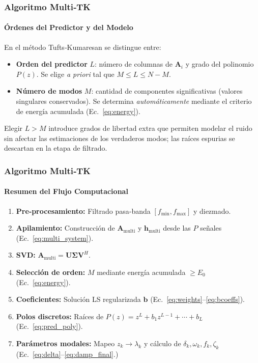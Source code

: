 \documentclass{beamer}
\begin{document}
\begin{frame}
\frametitle{Algoritmo Multi‑TK}
\framesubtitle{Órdenes del Predictor y del Modelo}

En el método Tufts‑Kumaresan se distingue entre:
\begin{itemize}
    \item \textbf{Orden del predictor} $L$: número de columnas de $\mathbf{A}_i$ y
          grado del polinomio $P(z)$. Se elige \emph{a priori} tal que
          $M \le L \le N-M$.
    \item \textbf{Número de modos} $M$: cantidad de componentes significativas
          (valores singulares conservados). Se determina \emph{automáticamente}
          mediante el criterio de energía acumulada (Ec.~\ref{eq:energy}).
\end{itemize}

\vspace{0.4em}
Elegir $L > M$ introduce grados de libertad extra que permiten modelar el
ruido sin afectar las estimaciones de los verdaderos modos; las raíces
espurias se descartan en la etapa de filtrado.
\end{frame}

\begin{frame}
\frametitle{Algoritmo Multi‑TK}
\framesubtitle{Resumen del Flujo Computacional}

\begin{enumerate}
    \item \textbf{Pre‑procesamiento:} Filtrado pasa‑banda $[f_{\min}, f_{\max}]$ y diezmado.
    \item \textbf{Apilamiento:} Construcción de $\mathbf{A}_{\text{multi}}$ y $\mathbf{h}_{\text{multi}}$
          desde las $P$ señales (Ec.~\ref{eq:multi_system}).
    \item \textbf{SVD:} $\mathbf{A}_{\text{multi}} = \mathbf{U}\boldsymbol{\Sigma}\mathbf{V}^H$.
    \item \textbf{Selección de orden:} $M$ mediante energía acumulada $\ge E_0$ (Ec.~\ref{eq:energy}).
    \item \textbf{Coeficientes:} Solución LS regularizada $\mathbf{b}$ (Ec.~\ref{eq:weights}--\ref{eq:bcoeffs}).
    \item \textbf{Polos discretos:} Raíces de $P(z) = z^L + b_1 z^{L-1} + \cdots + b_L$ (Ec.~\ref{eq:pred_poly}).
    \item \textbf{Parámetros modales:} Mapeo $z_k \to \lambda_k$ y cálculo de $\delta_k, \omega_k, f_k, \zeta_k$
          (Ec.~\ref{eq:delta}--\ref{eq:damp_final}.)
\end{enumerate}


\end{frame}
\end{document}
